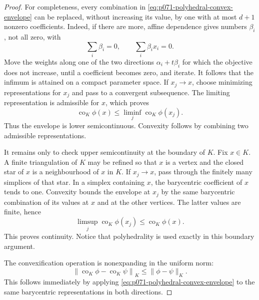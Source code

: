 \begin{proof}
For completeness, every combination in
\eqref{eq:p071-polyhedral-convex-envelope} can be replaced, without
increasing its value, by one with at most \(d+1\) nonzero coefficients.
Indeed, if there are more, affine dependence gives numbers \(\beta_i\),
not all zero, with
\[
             \sum_i\beta_i=0,\qquad \sum_i\beta_i x_i=0.
\]
Move the weights along one of the two directions
\(\alpha_i+t\beta_i\) for which the objective does not increase, until a
coefficient becomes zero, and iterate.  It follows that the infimum is
attained on a compact parameter space.  If \(x_j\to x\), choose minimizing
representations for \(x_j\) and pass to a convergent subsequence.  The
limiting representation is admissible for \(x\), which proves
\[
 \operatorname{co}_K\phi(x)
 \leq\liminf_j\operatorname{co}_K\phi(x_j).
\]
Thus the envelope is lower semicontinuous.  Convexity follows by combining
two admissible representations.

It remains only to check upper semicontinuity at the boundary of \(K\).
Fix \(x\in K\).  A finite triangulation of \(K\) may be refined so that
\(x\) is a vertex and the closed star of \(x\) is a neighbourhood of
\(x\) in \(K\).  If \(x_j\to x\), pass through the finitely many simplices
of that star.  In a simplex containing \(x\), the barycentric coefficient
of \(x\) tends to one.  Convexity bounds the envelope at \(x_j\) by the
same barycentric combination of its values at \(x\) and at the other
vertices.  The latter values are finite, hence
\[
 \limsup_j\operatorname{co}_K\phi(x_j)
 \leq\operatorname{co}_K\phi(x).
\]
This proves continuity.  Notice that polyhedrality is used exactly in
this boundary argument.

The convexification operation is nonexpanding in the uniform norm:
\begin{equation}
 \left\|\operatorname{co}_K\phi-\operatorname{co}_K\psi\right\|_K
 \leq \|\phi-\psi\|_K .
 \label{eq:p071-polyhedral-envelope-nonexpanding}
\end{equation}
This follows immediately by applying
\eqref{eq:p071-polyhedral-convex-envelope} to the same barycentric
representations in both directions.


\end{proof}
